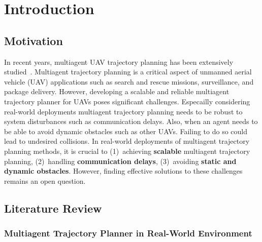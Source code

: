 \chapter{Introduction}\label{chap:intoroduction}

\section{Motivation}

In recent years, multiagent UAV trajectory planning has been extensively studied~\cite{ryou_cooperative_2022, peng2022obstacle, gao2022meeting, tordesillas2020mader, kondo2023robust, zhou2020ego-swarm, sebetghadam2022distributed, robinson2018efficient, park2020efficient, Hou2022EnhancedDA, firoozi2020distributed, toumieh2023decentralized, wang2022robust, batra2022decentralized}. 
Multiagent trajectory planning is a critical aspect of unmanned aerial vehicle (UAV) applications such as search and rescue missions, surveillance, and package delivery. However, developing a scalable and reliable multiagent trajectory planner for UAVs poses significant challenges. 
Especailly considering real-world deployments multiagent trajectory planning needs to be robust to system disturbances such as communication delays. 
Also, when an agent needs to be able to avoid dynamic obstacles such as other UAVs. Failing to do so could lead to undesired collisions.
In real-world deployments of multiagent trajectory planning methods, it is crucial to (1)~achieving \textbf{scalable} multiagent trajectory planning, (2)~handling \textbf{communication delays}, (3)~avoiding \textbf{static and dynamic obstacles}.
However, finding effective solutions to these challenges remains an open question.

\section{Literature Review}\label{sec:literature_review}

\subsection{Multiagent Trajectory Planner in Real-World Environment}

